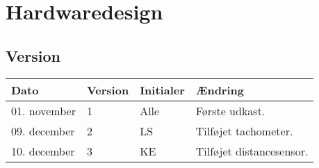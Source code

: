 \chapter{Hardwaredesign}
\section*{Version}
\begin{table}[h]
	\centering
	\begin{tabularx}{\textwidth - 2cm}{|l|l|l|X|}
	\hline
	Dato			& Version			& Initialer 		& Ændring										\\ \hline
	01. november 			& 1 				& Alle				& Første udkast. 						\\ \hline
	09. december 			& 2 				& LS				& Tilføjet tachometer.					\\ \hline
	10. december 			& 3 				& KE				& Tilføjet distancesensor.				\\ \hline

	\end{tabularx}
\end{table}
\clearpage


\clearpage

\clearpage

\clearpage

\clearpage